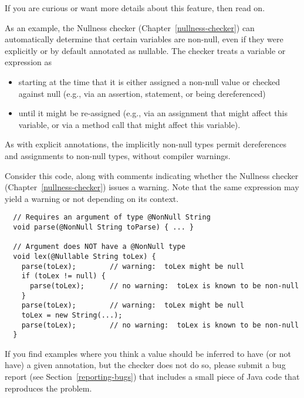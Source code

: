 If you are curious or want more details about this feature, then read on.

As an example, the Nullness checker (Chapter~\ref{nullness-checker}) can automatically
determine that certain variables are non-null, even if they were explicitly
or by default annotated as nullable.
The checker treats a variable or expression as 
\begin{itemize}
\item
starting at the time that it is either
assigned a non-null value or checked against null (e.g., via an assertion,
 statement, or being dereferenced)
\item
until it might be re-assigned (e.g.,
via an assignment that might affect this variable, or via a method call
that might affect this variable).
\end{itemize}

As with explicit annotations, the implicitly non-null types permit
dereferences and assignments to non-null types, without
compiler warnings.

Consider this code, along with comments indicating whether the
Nullness checker (Chapter~\ref{nullness-checker}) issues a warning.  Note that the same expression may yield a
warning or not depending on its context.

\begin{Verbatim}
  // Requires an argument of type @NonNull String
  void parse(@NonNull String toParse) { ... }

  // Argument does NOT have a @NonNull type
  void lex(@Nullable String toLex) {
    parse(toLex);        // warning:  toLex might be null
    if (toLex != null) {
      parse(toLex);      // no warning:  toLex is known to be non-null
    }
    parse(toLex);        // warning:  toLex might be null
    toLex = new String(...);
    parse(toLex);        // no warning:  toLex is known to be non-null
  }
\end{Verbatim}

If you find examples where you think a value should be inferred to have
(or not have) a
given annotation, but the checker does not do so, please submit a bug
report (see Section~\ref{reporting-bugs}) that includes a small piece of
Java code that reproduces the problem.

%
%


